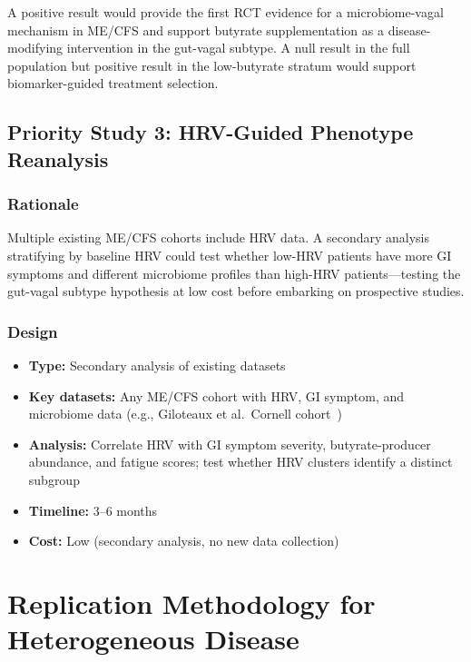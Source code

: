 A positive result would provide the first RCT evidence for a microbiome-vagal mechanism in ME/CFS and support butyrate supplementation as a disease-modifying intervention in the gut-vagal subtype. A null result in the full population but positive result in the low-butyrate stratum would support biomarker-guided treatment selection.

\subsection{Priority Study 3: HRV-Guided Phenotype Reanalysis}

\subsubsection{Rationale}

Multiple existing ME/CFS cohorts include HRV data. A secondary analysis stratifying by baseline HRV could test whether low-HRV patients have more GI symptoms and different microbiome profiles than high-HRV patients---testing the gut-vagal subtype hypothesis at low cost before embarking on prospective studies.

\subsubsection{Design}
\begin{itemize}
    \item \textbf{Type:} Secondary analysis of existing datasets
    \item \textbf{Key datasets:} Any ME/CFS cohort with HRV, GI symptom, and microbiome data (e.g., Giloteaux et al.\ Cornell cohort~\cite{Giloteaux2016})
    \item \textbf{Analysis:} Correlate HRV with GI symptom severity, butyrate-producer abundance, and fatigue scores; test whether HRV clusters identify a distinct subgroup
    \item \textbf{Timeline:} 3--6 months
    \item \textbf{Cost:} Low (secondary analysis, no new data collection)
\end{itemize}

\section{Replication Methodology for Heterogeneous Disease}
\label{sec:replication-heterogeneous}

